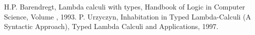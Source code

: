 \begin{thebibliography}{9}
H.P. Barendregt, Lambda calculi with types, Handbook of Logic in Computer Science, Volume , 1993.
P. Urzyczyn, Inhabitation in Typed Lambda-Calculi (A Syntactic Approach), Typed Lambda Calculi and Applications, 1997.
\end{thebibliography}